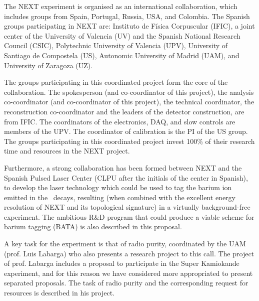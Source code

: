 The NEXT experiment is organised as an international collaboration, which includes groups from Spain, Portugal, Russia, USA, and Colombia. The Spanish groups participating in NEXT are: Instituto de Física Corpuscular (IFIC), a joint center of the University of Valencia (UV) and the Spanish National Research Council (CSIC), Polytechnic University of Valencia (UPV), University of Santiago de Compostela (US), Autonomic University of Madrid (UAM), and University of Zaragoza (UZ). 

The groups participating in this coordinated project form the core of the collaboration. The spokesperson (and co-coordinator of this project), the analysis co-coordinator (and co-coordinator of this project), the technical coordinator, the reconstruction co-coordinator and the leaders of the detector construction, are from IFIC. The coordinators of the electronics, DAQ, and slow controls are members of the UPV. The coordinator of calibration is the PI of the US group. The groups participating in this coordinated project invest 100\% of their research time and resources in the NEXT project. 

Furthermore, a strong collaboration has been  formed between NEXT and the Spanish Pulsed Laser Center (CLPU after the initials of the center in Spanish), to develop the laser technology which could be used to tag the barium ion emitted in the \bb\ decays, resulting (when combined with the excellent energy resolution of NEXT and its topological signature) in a virtually background-free experiment. The ambitious R\&D program that could produce a viable scheme for barium tagging (BATA) is also described in this proposal.  

A key task for the experiment is that of radio purity, coordinated by the UAM (prof. Luis Labarga) who also presents a research project to this call. The project of prof. Labarga includes a proposal to participate in the Super Kamiokande experiment, and for this reason we have considered more appropriated to present separated proposals. The task of radio purity and the corresponding request for resources is described in his project.
%


